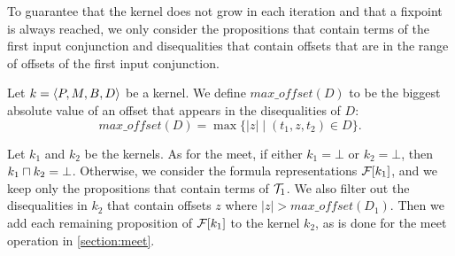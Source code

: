 To guarantee that the kernel does not grow in each iteration
and that a fixpoint is always reached, we only consider the propositions that contain terms of the first input conjunction
and disequalities that contain offsets that are in the range of offsets of the first input conjunction.

Let $k = \langle P,M,B,D\rangle$ be a kernel. We define $max\_offset(D)$ to be the biggest absolute value of an offset that appears in the disequalities of $D$:
\[
max\_offset(D) = \max\{ \lvert z \rvert \mid (t_1,z,t_2) \in D \}.
\]

Let $k_1$ and $k_2$ be the kernels.
As for the meet, if either $k_1 = \bot$ or $k_2 = \bot$, then $k_1 \sqcap k_2 = \bot$.
Otherwise, we consider the formula representations $\mathcal{F}[k_1]$, and we keep only the propositions that contain terms of $\mathcal{T}_1$.
We also filter out the disequalities in $k_2$ that contain offsets $z$ where $\lvert z \rvert > max\_offset(D_1)$.
Then we add each remaining proposition of $\mathcal{F}[k_1]$ to the kernel $k_2$,
as is done for the meet operation in \cref{section:meet}.
